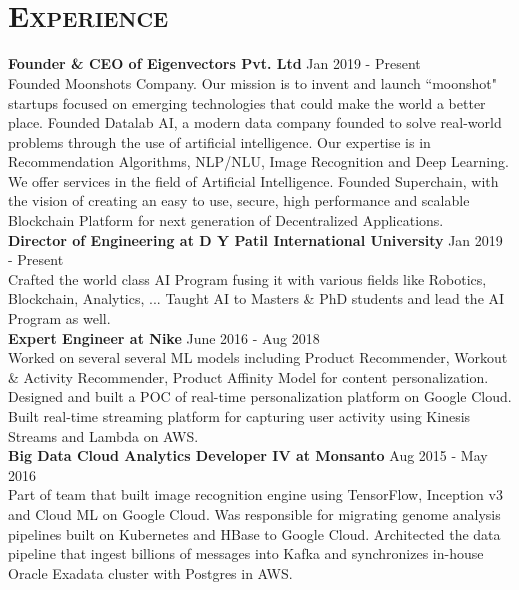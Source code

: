 \begin{resume}
\begin{formatb}
  \\
  \body\\
\end{formatb}

\section{\textsc{Experience}}
\textbf{Founder \& CEO of Eigenvectors Pvt. Ltd} \hfill Jan 2019 - Present\\
Founded Moonshots Company. Our mission is to invent and launch ``moonshot" startups focused on emerging technologies that could make the world a better place. Founded Datalab AI, a modern data company founded to solve real-world problems through the use of artificial intelligence. Our expertise is in Recommendation Algorithms, NLP/NLU, Image Recognition and Deep Learning. We offer services in the field of Artificial Intelligence.
Founded Superchain, with the vision of creating an easy to use, secure, high performance and scalable Blockchain Platform for next generation of Decentralized Applications.\\
\textbf{Director of Engineering at D Y Patil International University} \hfill Jan 2019 - Present\\
Crafted the world class AI Program fusing it with various fields like Robotics, Blockchain, Analytics, ... 
Taught AI to Masters \& PhD students and lead the AI Program as well. \\
\textbf{Expert Engineer at Nike} \hfill June 2016 - Aug 2018\\
Worked on several several ML models including Product Recommender, Workout \& Activity Recommender, Product Affinity Model for content personalization. Designed and built a POC of real-time personalization platform on Google Cloud. Built real-time streaming platform for capturing user activity using Kinesis Streams and Lambda on AWS.\\
\textbf{Big Data Cloud Analytics Developer IV at Monsanto} \hfill Aug 2015 - May 2016\\
Part of team that built image recognition engine using TensorFlow, Inception v3 and Cloud ML on Google Cloud. Was responsible for migrating genome analysis pipelines built on Kubernetes and HBase to Google Cloud. Architected the data pipeline that ingest billions of messages into Kafka and synchronizes in-house Oracle Exadata cluster with Postgres in AWS.\\ \\

\end{resume}
